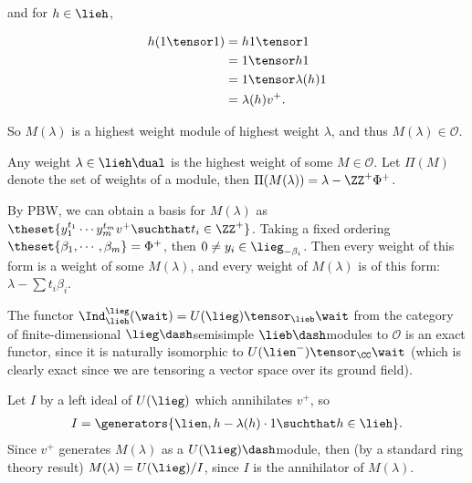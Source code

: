 and for \(h\in \lieh\),

\begin{align*}
h(1\tensor 1) 
&= h1\tensor 1 \\
&= 1 \tensor h1\\
&=1 \tensor \lambda(h) 1 \\
&=\lambda(h) v^+
.\end{align*}

So \(M(\lambda)\) is a highest weight module of highest weight
\(\lambda\), and thus \(M(\lambda) \in \mathcal O\).

\begin{remark}

Any weight \(\lambda \in \lieh\dual\) is the highest weight of some
\(M\in \mathcal O\). Let \(\Pi(M)\) denote the set of weights of a
module, then \(\Pi(M(\lambda)) = \lambda - \ZZ^+ \Phi^+\).

By PBW, we can obtain a basis for \(M(\lambda)\) as
\(\theset{ y_1^{t_1} \cdots y_m^{t_m}v^+ \suchthat t_i \in \ZZ^+}\).
Taking a fixed ordering \(\theset{\beta_1, \cdots, \beta_m} = \Phi^+\),
then \(0\neq y_i \in \lieg_{-\beta_i}\). Then every weight of this form
is a weight of some \(M(\lambda)\), and every weight of \(M(\lambda)\)
is of this form: \(\lambda - \sum t_i \beta_i\).

\end{remark}

\begin{remark}

The functor \(\Ind_\lieh^\lieg(\wait) = U(\lieg) \tensor_{\lieb} \wait\)
from the category of finite-dimensional \(\lieg\dash\)semisimple
\(\lieb\dash\)modules to \(\mathcal O\) is an exact functor, since it is
naturally isomorphic to \(U(\lien^-) \tensor_\CC \wait\) (which is
clearly exact since we are tensoring a vector space over its ground
field).

\end{remark}

\begin{proposition}

Let \(I\) by a left ideal of \(U(\lieg)\) which annihilates \(v^+\), so
\begin{align*}
I = \generators{\lien, h-\lambda(h)\cdot 1 \suchthat h\in\lieh}
.\end{align*} Since \(v^+\) generates \(M(\lambda)\) as a
\(U(\lieg)\dash\)module, then (by a standard ring theory result)
\(M(\lambda) = U(\lieg)/I\), since \(I\) is the annihilator of
\(M(\lambda)\).

\end{proposition}

